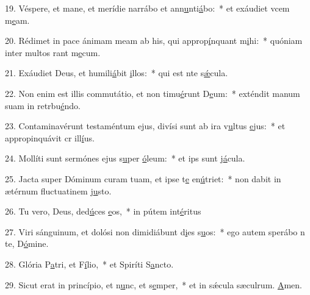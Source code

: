 19. Véspere, et mane, et merídie narrábo et ann\uline{u}nti\uline{á}bo:~* et exáudiet vcem m\uline{e}am.\par 
20. Rédimet in pace ánimam meam ab his, qui approp\uline{í}nquant m\uline{i}hi:~* quóniam inter multos rant m\uline{e}cum.\par 
21. Exáudiet Deus, et humili\uline{á}bit \uline{i}llos:~* qui est nte s\uline{ǽ}cula.\par 
22. Non enim est illis commutátio, et non timu\uline{é}runt D\uline{e}um:~* exténdit manum suam in retrbu\uline{é}ndo.\par 
23. Contaminavérunt testaméntum ejus, divísi sunt ab ira v\uline{u}ltus \uline{e}jus:~* et appropinquávit cr ill\uline{í}us.\par 
24. Mollíti sunt sermónes ejus s\uline{u}per \uline{ó}leum:~* et ips sunt j\uline{á}cula.\par 
25. Jacta super Dóminum curam tuam, et ipse t\uline{e} en\uline{ú}triet:~* non dabit in ætérnum fluctuatinem j\uline{u}sto.\par 
26. Tu vero, Deus, ded\uline{ú}ces \uline{e}os,~* in pútem int\uline{é}ritus\par 
27. Viri sánguinum, et dolósi non dimidiábunt d\uline{i}es s\uline{u}os:~* ego autem sperábo n te, D\uline{ó}mine.\par 
28. Glória P\uline{a}tri, et F\uline{í}lio,~* et Spiríti S\uline{a}ncto.\par 
29. Sicut erat in princípio, et n\uline{u}nc, et s\uline{e}mper,~* et in sǽcula sæculrum. \uline{A}men.\par 
